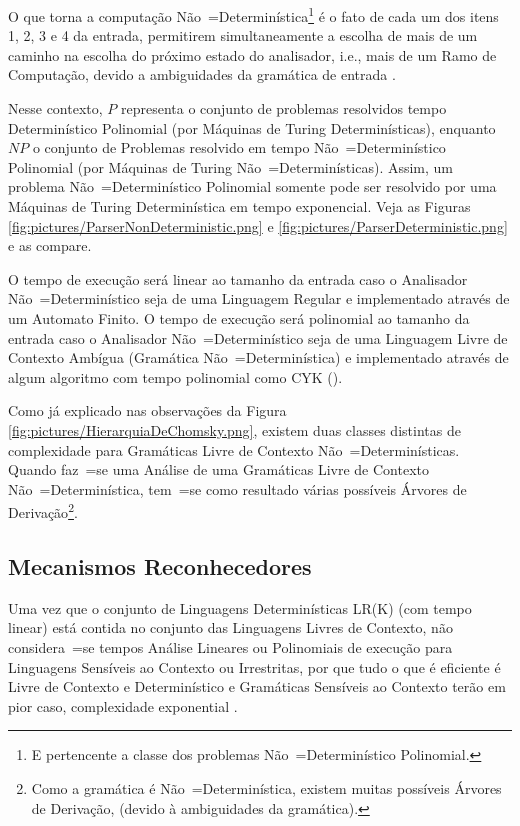{    O que torna a computação Não~=Determinística\footnote{
    E pertencente a classe dos problemas Não~=Determinístico Polinomial.
    } é o fato de cada um dos itens 1,
    2, 3 e 4 da entrada,
    permitirem simultaneamente a escolha de mais de um caminho na escolha do próximo estado do analisador,
    i.e.,
    mais de um Ramo de Computação,
    devido a ambiguidades da gramática de entrada \cite{antlrBookTerrentParr}.

    Nesse contexto,
    $P$ representa o conjunto de problemas resolvidos tempo Determinístico Polinomial (por Máquinas de Turing Determinísticas),
    enquanto $NP$ o conjunto de Problemas resolvido em tempo Não~=Determinístico Polinomial (por Máquinas de Turing Não~=Determinísticas).
    Assim,
    um problema Não~=Determinístico Polinomial somente pode ser resolvido por uma Máquinas de Turing Determinística em tempo exponencial.
    Veja as Figuras \ref{fig:pictures/ParserNonDeterministic.png} e
    \ref{fig:pictures/ParserDeterministic.png} e
    as compare.

    O tempo de execução será linear ao tamanho da entrada caso o Analisador Não~=Determinístico seja de uma Linguagem Regular e
    implementado através de um Automato Finito.
    O tempo de execução será polinomial ao tamanho da entrada caso o Analisador Não~=Determinístico seja de uma Linguagem Livre de Contexto Ambígua (Gramática Não~=Determinística) e
    implementado através de algum algoritmo com tempo polinomial como CYK ().

    Como já explicado nas observações da Figura \ref{fig:pictures/HierarquiaDeChomsky.png},
    existem duas classes distintas de complexidade para Gramáticas Livre de Contexto Não~=Determinísticas.
    Quando faz~=se uma Análise de uma Gramáticas Livre de Contexto Não~=Determinística,
    tem~=se como resultado várias possíveis Árvores de Derivação\footnote{
    Como a gramática é Não~=Determinística,
    existem muitas possíveis Árvores de Derivação,
    (devido à ambiguidades da gramática).
    }.


\subsection{Mecanismos Reconhecedores}
\label{mecanismosReconhecedores}

    Uma vez que o conjunto de Linguagens Determinísticas LR(K) (com tempo linear) está contida no conjunto das Linguagens Livres de Contexto,
    não considera~=se tempos Análise Lineares ou
    Polinomiais de execução para Linguagens Sensíveis ao Contexto ou
    Irrestritas,
    por que tudo o que é eficiente é Livre de Contexto e
    Determinístico e
    Gramáticas Sensíveis ao Contexto terão em pior caso,
    complexidade exponential \cite{growingContextSensitiveLanguages}.

}
